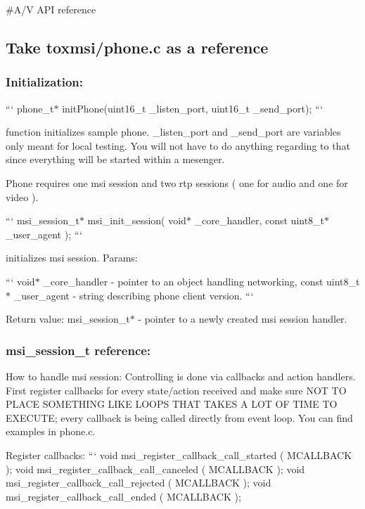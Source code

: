 \#\+A/\+V A\+P\+I reference

\subsection*{Take toxmsi/phone.\+c as a reference}

\subsubsection*{Initialization\+:}

``` phone\+\_\+t$\ast$ init\+Phone(uint16\+\_\+t \+\_\+listen\+\_\+port, uint16\+\_\+t \+\_\+send\+\_\+port); ```

function initializes sample phone. \+\_\+listen\+\_\+port and \+\_\+send\+\_\+port are variables only meant for local testing. You will not have to do anything regarding to that since everything will be started within a mesenger.

Phone requires one msi session and two rtp sessions ( one for audio and one for video ).

``` msi\+\_\+session\+\_\+t$\ast$ msi\+\_\+init\+\_\+session( void$\ast$ \+\_\+core\+\_\+handler, const uint8\+\_\+t$\ast$ \+\_\+user\+\_\+agent ); ```

initializes msi session. Params\+:

``` void$\ast$ \+\_\+core\+\_\+handler -\/ pointer to an object handling networking, const uint8\+\_\+t$\ast$ \+\_\+user\+\_\+agent -\/ string describing phone client version. ```

Return value\+: msi\+\_\+session\+\_\+t$\ast$ -\/ pointer to a newly created msi session handler.

\subsubsection*{msi\+\_\+session\+\_\+t reference\+:}

How to handle msi session\+: Controlling is done via callbacks and action handlers. First register callbacks for every state/action received and make sure N\+O\+T T\+O P\+L\+A\+C\+E S\+O\+M\+E\+T\+H\+I\+N\+G L\+I\+K\+E L\+O\+O\+P\+S T\+H\+A\+T T\+A\+K\+E\+S A L\+O\+T O\+F T\+I\+M\+E T\+O E\+X\+E\+C\+U\+T\+E; every callback is being called directly from event loop. You can find examples in phone.\+c.

Register callbacks\+: ``` void msi\+\_\+register\+\_\+callback\+\_\+call\+\_\+started ( M\+C\+A\+L\+L\+B\+A\+C\+K ); void msi\+\_\+register\+\_\+callback\+\_\+call\+\_\+canceled ( M\+C\+A\+L\+L\+B\+A\+C\+K ); void msi\+\_\+register\+\_\+callback\+\_\+call\+\_\+rejected ( M\+C\+A\+L\+L\+B\+A\+C\+K ); void msi\+\_\+register\+\_\+callback\+\_\+call\+\_\+ended ( M\+C\+A\+L\+L\+B\+A\+C\+K );

